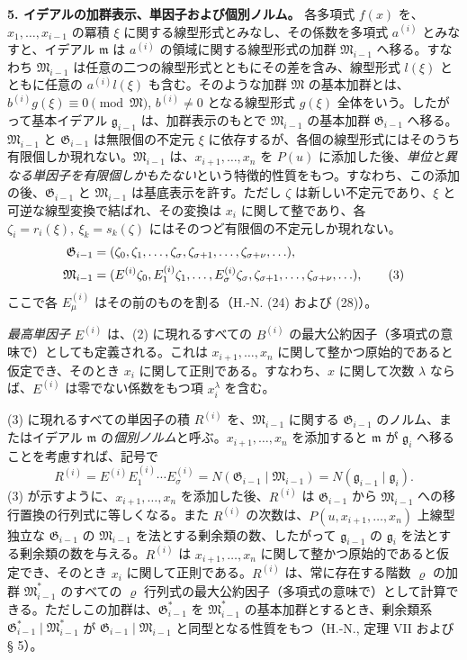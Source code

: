 \documentclass[11pt]{article}
\providecommand{\frakM}{\mathfrak M}
\providecommand{\frakG}{\mathfrak G}
\providecommand{\frakm}{\mathfrak m}
\providecommand{\frakg}{\mathfrak g}
\begin{document}
\textbf{5. イデアルの加群表示、単因子および個別ノルム。} 各多項式 $f(x)$ を、$x_1,\ldots,x_{i-1}$ の冪積 $\xi$ に関する線型形式とみなし、その係数を多項式 $a^{(i)}$ とみなすと、イデアル $\frakm$ は $a^{(i)}$ の領域に関する線型形式の加群 $\frakM_{i-1}$ へ移る。すなわち $\frakM_{i-1}$ は任意の二つの線型形式とともにその差を含み、線型形式 $l(\xi)$ とともに任意の $a^{(i)}l(\xi)$ も含む。そのような加群 $\frakM$ の基本加群とは、$b^{(i)}g(\xi)\equiv0\pmod{\frakM}$, $b^{(i)}\ne0$ となる線型形式 $g(\xi)$ 全体をいう。したがって基本イデアル $\frakg_{i-1}$ は、加群表示のもとで $\frakM_{i-1}$ の基本加群 $\frakG_{i-1}$ へ移る。$\frakM_{i-1}$ と $\frakG_{i-1}$ は無限個の不定元 $\xi$ に依存するが、各個の線型形式にはそのうち有限個しか現れない。$\frakM_{i-1}$ は、$x_{i+1},\ldots,x_n$ を $P(u)$ に添加した後、\emph{単位と異なる単因子を有限個しかもたない}という特徴的性質をもつ。すなわち、この添加の後、$\frakG_{i-1}$ と $\frakM_{i-1}$ は基底表示を許す。ただし $\zeta$ は新しい不定元であり、$\xi$ と可逆な線型変換で結ばれ、その変換は $x_i$ に関して整であり、各 $\zeta_i=r_i(\xi),\ \xi_k=s_k(\zeta)$ にはそのつど有限個の不定元しか現れない。
\begin{align}
\frakG_{i-1}&=(\zeta_0,\zeta_1,\ldots,\zeta_\sigma,\zeta_{\sigma+1},\ldots,\zeta_{\sigma+\nu},\ldots), \notag\\
\frakM_{i-1}&=(E^{(i)}\zeta_0,E_1^{(i)}\zeta_1,\ldots,E_\sigma^{(i)}\zeta_\sigma,
\zeta_{\sigma+1},\ldots,\zeta_{\sigma+\nu},\ldots), \tag{3}
\end{align}
ここで各 $E_\mu^{(i)}$ はその前のものを割る（H.-N. (24) および (28)）。

\emph{最高単因子} $E^{(i)}$ は、(2) に現れるすべての $B^{(i)}$ の最大公約因子（多項式の意味で）としても定義される。これは $x_{i+1},\ldots,x_n$ に関して整かつ原始的であると仮定でき、そのとき $x_i$ に関して正則である。すなわち、$x$ に関して次数 $\lambda$ ならば、$E^{(i)}$ は零でない係数をもつ項 $x_i^\lambda$ を含む。

(3) に現れるすべての単因子の積 $R^{(i)}$ を、$\frakM_{i-1}$ に関する $\frakG_{i-1}$ のノルム、またはイデアル $\frakm$ の\emph{個別ノルム}と呼ぶ。$x_{i+1},\ldots,x_n$ を添加すると $\frakm$ が $\frakg_i$ へ移ることを考慮すれば、記号で
\begin{equation*}
 R^{(i)}=E^{(i)}E_1^{(i)}\cdots E_\sigma^{(i)}
 =N(\frakG_{i-1}\mid\frakM_{i-1})=N(\frakg_{i-1}\mid\frakg_i).
\end{equation*}
(3) が示すように、$x_{i+1},\ldots,x_n$ を添加した後、$R^{(i)}$ は $\frakG_{i-1}$ から $\frakM_{i-1}$ への移行置換の行列式に等しくなる。また $R^{(i)}$ の次数は、$P(u,x_{i+1},\ldots,x_n)$ 上線型独立な $\frakG_{i-1}$ の $\frakM_{i-1}$ を法とする剰余類の数、したがって $\frakg_{i-1}$ の $\frakg_i$ を法とする剰余類の数を与える。$R^{(i)}$ は $x_{i+1},\ldots,x_n$ に関して整かつ原始的であると仮定でき、そのとき $x_i$ に関して正則である。$R^{(i)}$ は、常に存在する階数 $\varrho$ の加群 $\frakM^*_{i-1}$ のすべての $\varrho$ 行列式の最大公約因子（多項式の意味で）として計算できる。ただしこの加群は、$\frakG^*_{i-1}$ を $\frakM^*_{i-1}$ の基本加群とするとき、剰余類系 $\frakG^*_{i-1}\mid\frakM^*_{i-1}$ が $\frakG_{i-1}\mid\frakM_{i-1}$ と同型となる性質をもつ（H.-N., 定理 VII および § 5）。
\end{document}
